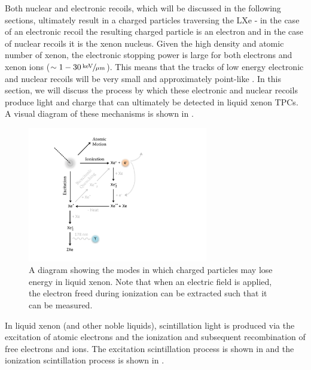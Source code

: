 Both nuclear and electronic recoils, which will be discussed in the following sections, ultimately result in a charged particles traversing the LXe - in the case of an electronic recoil the resulting charged particle is an electron and in the case of nuclear recoils it is the xenon nucleus.  Given the high density and atomic number of xenon, the electronic stopping power is large for both electrons and xenon ions ($\sim 1-30 \, \sfrac{\textrm{keV}}{\mu \textrm{m}}$).  This means that the tracks of low energy electronic and nuclear recoils will be very small and approximately point-like \cite{aprile2006simultaneous}.  In this section, we will discuss the process by which these electronic and nuclear recoils produce light and charge that can ultimately be detected in liquid xenon TPCs.  A visual diagram of these mechanisms is shown in .

\begin{figure}[t]
	\centering
	\includegraphics[width=0.7\textwidth]{observables_diagram}
	\caption{A diagram showing the modes in which charged particles may lose energy in liquid xenon.  Note that when an electric field is applied, the electron freed during ionization can be extracted such that it can be measured.}
	\label{fig:diagram_energy_deposition}
\end{figure}


In liquid xenon (and other noble liquids), scintillation light is produced via the excitation of atomic electrons and the ionization and subsequent recombination of free electrons and ions.  The excitation scintillation process is shown in  and the ionization scintillation process is shown in .  




